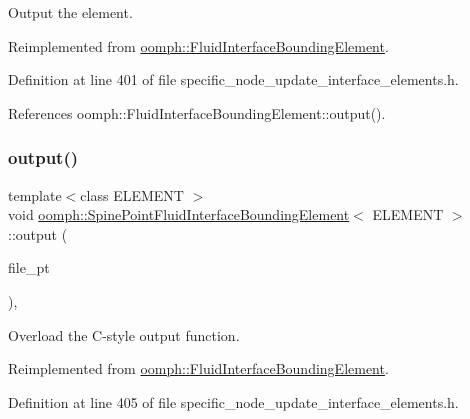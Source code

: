 Output the element. 



Reimplemented from \hyperlink{classoomph_1_1FluidInterfaceBoundingElement_af2c821d51d506221976a0c17e1615ac3}{oomph\+::\+Fluid\+Interface\+Bounding\+Element}.



Definition at line 401 of file specific\+\_\+node\+\_\+update\+\_\+interface\+\_\+elements.\+h.



References oomph\+::\+Fluid\+Interface\+Bounding\+Element\+::output().

\mbox{\label{classoomph_1_1SpinePointFluidInterfaceBoundingElement_a2435b4b786ede183808834b4d0c5210c}} 
\subsubsection{\texorpdfstring{output()}{output()}\hspace{0.1cm}{\footnotesize\ttfamily [3/4]}}
{\footnotesize\ttfamily template$<$class E\+L\+E\+M\+E\+NT $>$ \\
void \hyperlink{classoomph_1_1SpinePointFluidInterfaceBoundingElement}{oomph\+::\+Spine\+Point\+Fluid\+Interface\+Bounding\+Element}$<$ E\+L\+E\+M\+E\+NT $>$\+::output (\begin{DoxyParamCaption}\item[{F\+I\+LE $\ast$}]{file\+\_\+pt }\end{DoxyParamCaption})\hspace{0.3cm}{\ttfamily [inline]}, {\ttfamily [virtual]}}



Overload the C-\/style output function. 



Reimplemented from \hyperlink{classoomph_1_1FluidInterfaceBoundingElement_a85cc62405429744e3e3585894315cb9e}{oomph\+::\+Fluid\+Interface\+Bounding\+Element}.



Definition at line 405 of file specific\+\_\+node\+\_\+update\+\_\+interface\+\_\+elements.\+h.




